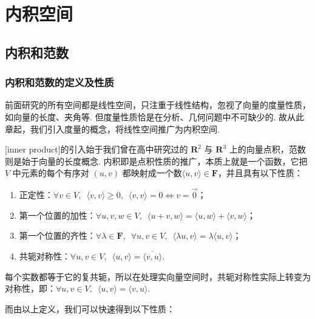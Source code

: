 \chapter{内积空间}

\section{内积和范数}

\subsection{内积和范数的定义及性质}

前面研究的所有空间都是线性空间，只注重于线性结构，忽视了向量的度量性质，如向量的长度、夹角等. 但度量性质恰是在分析、几何问题中不可缺少的. 故从此章起，我们引入度量的概念，将线性空间推广为内积空间.

[inner product]的引入始于我们曾在高中研究过的 $\mathbf{R}^{2}$ 与 $\mathbf{R}^{3}$ 上的向量点积，范数则是始于向量的长度概念. 内积即是点积性质的推广，本质上就是一个函数，它把 $ V $ 中元素的每个有序对 $(u, v)$ 都映射成一个数$ \langle u, v \rangle \in \mathbf{F}$，并且具有以下性质：

\begin{enumerate}
    \item 正定性：$\forall v \in V, \enspace \langle v, v \rangle \geqslant 0, \enspace \langle v, v \rangle = 0 \iff v = \vec{0}$；

    \item 第一个位置的加性：$\forall u, v, w \in V, \enspace \langle u + v, w \rangle = \langle u, w \rangle + \langle v, w \rangle$；

    \item 第一个位置的齐性：$\forall \lambda \in \mathbf{F}, \enspace \forall u, v \in V, \enspace \langle \lambda u, v \rangle = \lambda \langle u, v \rangle$；

    \item 共轭对称性：$\forall u, v \in V, \enspace \langle u, v \rangle = \overline{\langle v, u \rangle}$.
\end{enumerate}

每个实数都等于它的复共轭，所以在处理实向量空间时，共轭对称性实际上转变为对称性，即：$\forall u, v \in V, \enspace \langle u, v \rangle = \langle v, u \rangle$.

而由以上定义，我们可以快速得到以下性质：

